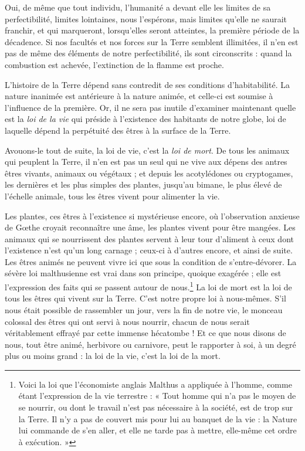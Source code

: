 \documentclass[a4paper, 11pt, oneside]{article}
\begin{document}
Oui, de même que tout individu, l'humanité a devant elle les limites de sa perfectibilité, limites lointaines, nous l'espérons, mais limites qu'elle ne saurait franchir, et qui marqueront, lorsqu'elles seront atteintes, la première période de la décadence. Si nos facultés et nos forces sur la Terre semblent illimitées, il n'en est pas de même des éléments de notre perfectibilité, ils sont circonscrits : quand la combustion est achevée, l'extinction de la flamme est proche.

L'histoire de la Terre dépend sans contredit de ses conditions d'habitabilité. La nature inanimée est antérieure à la nature animée, et celle-ci est soumise à l'influence de la première. Or, il ne sera pas inutile d'examiner maintenant quelle est la \emph{loi de la vie} qui préside à l'existence des habitants de notre globe, loi de laquelle dépend la perpétuité des êtres à la surface de la Terre.

Avouons-le tout de suite, la loi de vie, c'est la \emph{loi de mort}. De tous les animaux qui peuplent la Terre, il n'en est pas un seul qui ne vive aux dépens des antres êtres vivants, animaux ou végétaux ; et depuis les acotylédones ou cryptogames, les dernières et les plus simples des plantes, jusqu'au bimane, le plus élevé de l'échelle animale, tous les êtres vivent pour alimenter la vie.

Les plantes, ces êtres à l'existence si mystérieuse encore, où l'observation anxieuse de Gœthe croyait reconnaître une âme, les plantes vivent pour être mangées. Les animaux qui se nourrissent des plantes servent à leur tour d'aliment à ceux dont l'existence n'est qu'un long carnage ; ceux-ci à d'autres encore, et ainsi de suite. Les êtres animés ne peuvent vivre ici que sous la condition de s'entre-dévorer. La sévère loi malthusienne est vrai dans son principe, quoique exagérée ; elle est l'expression des faits qui se passent autour de nous.\footnote{Voici la loi que l'économiste anglais Malthus a appliquée à l'homme, comme étant l'expression de la vie terrestre : « Tout homme qui n'a pas le moyen de se nourrir, ou dont le travail n'est pas nécessaire à la société, est de trop sur la Terre. Il n'y a pas de couvert mis pour lui au banquet de la vie : la Nature lui commande de s'en aller, et elle ne tarde pas à mettre, elle-même cet ordre à exécution. »} La loi de mort est la loi de tous les êtres qui vivent sur la Terre. C'est notre propre loi à nous-mêmes. S'il nous était possible de rassembler un jour, vers la fin de notre vie, le monceau colossal des êtres qui ont servi à nous nourrir, chacun de nous serait véritablement effrayé par cette immense hécatombe ! Et ce que nous disons de nous, tout être animé, herbivore ou carnivore, peut le rapporter à soi, à un degré plus ou moins grand : la loi de la vie, c'est la loi de la mort.
\end{document}
